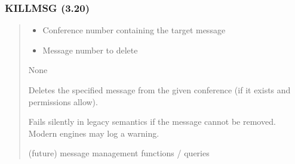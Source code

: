 \documentclass[letterpaper,10pt,english]{sphinxmanual}
\begin{document}
\subsubsection{KILLMSG (3.20)}
\label{\detokenize{ppl:killmsg-3-20}}\begin{quote}

\sphinxAtStartPar
{}
\begin{description}
\begin{itemize}
\item {} 
\sphinxAtStartPar
{} \textendash{} Conference number containing the target message

\item {} 
\sphinxAtStartPar
{}  \textendash{} Message number to delete

\end{itemize}

\sphinxAtStartPar
None

\sphinxAtStartPar
Deletes the specified message from the given conference (if it exists and permissions allow).

\end{description}

\sphinxAtStartPar
{}
\begin{quote}

\begin{sphinxVerbatim}[commandchars=\\\{\}]
 
\end{sphinxVerbatim}
\end{quote}
\begin{description}
\sphinxAtStartPar
Fails silently in legacy semantics if the message cannot be removed. Modern engines may log a warning.

\sphinxAtStartPar
(future) message management functions / queries

\end{description}
\end{quote}
\end{document}
